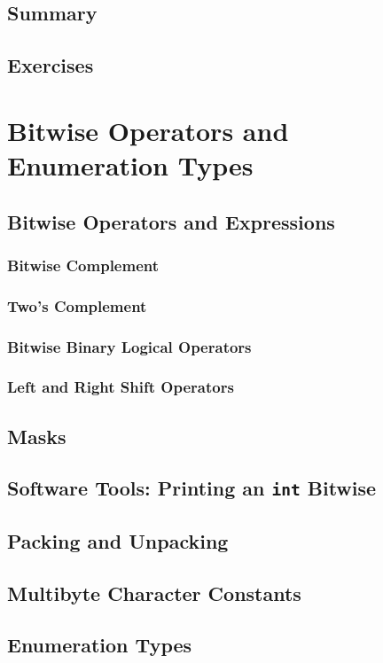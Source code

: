 \documentclass{article}
\begin{document}
\section{Summary}
\section{Exercises}

\chapter{Bitwise Operators and Enumeration Types}

\section{Bitwise Operators and Expressions}
\subsection{Bitwise Complement}
\subsection{Two’s Complement}
\subsection{Bitwise Binary Logical Operators}
\subsection{Left and Right Shift Operators}
\section{Masks}
\section{Software Tools: Printing an \texttt{int} Bitwise}
\section{Packing and Unpacking}
\section{Multibyte Character Constants}
\section{Enumeration Types}
\end{document}
